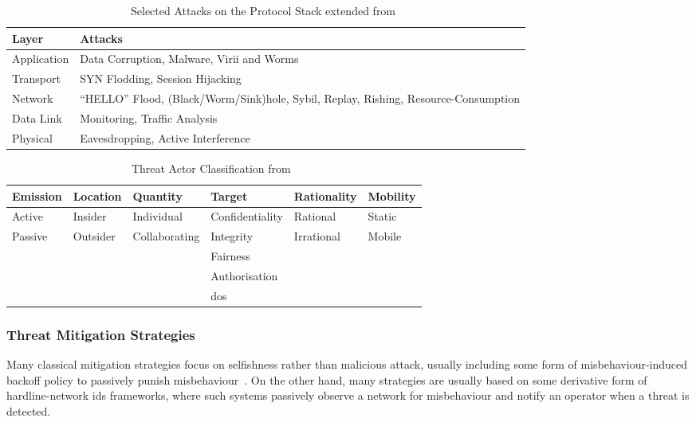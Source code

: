 \begin{table}
  \caption[Selected Attacks on the Protocol Stack]{Selected Attacks on the Protocol Stack extended from~\citet{csen2010security}}
  \label{tab:stack_attacks}
  \begin{tabularx}{\textwidth}{p{5cm} X}\toprule
    Layer & Attacks\\\midrule
    Application & Data Corruption, Malware, Virii and Worms\\
    Transport & SYN Flodding, Session Hijacking\\
    Network & ``HELLO'' Flood, (Black/Worm/Sink)hole, Sybil, Replay, Rishing, Resource-Consumption\\
    Data Link & Monitoring, Traffic Analysis\\
    Physical& Eavesdropping, Active Interference\\\bottomrule
  \end{tabularx}
\end{table}

\begin{table}
  \caption[Threat Actor Classification]{Threat Actor Classification from~\citet{Gagandeep2012}}
  \label{tab:attacker_class}
  \begin{tabularx}{\textwidth}{X X X X X X}\toprule
    Emission & Location & Quantity & Target & Rationality & Mobility \\\midrule
    Active & Insider & Individual & Confidentiality & Rational & Static\\
    Passive & Outsider & Collaborating & Integrity & Irrational & Mobile\\
            &         &               & Fairness & & \\
            &         &               & Authorisation & &\\
            &         &               &  \gls{dos} & &\\
    \bottomrule
    
  \end{tabularx}
\end{table}


\subsubsection{Threat Mitigation Strategies}



Many classical mitigation strategies focus on selfishness rather than malicious attack, usually including some form of misbehaviour-induced backoff policy to passively punish misbehaviour~\cite{Konorski2002,Cardenas:2004:DPM:1029102.1029107}.
On the other hand, many  strategies are usually based on some derivative form of hardline-network \gls{ids} frameworks, where such systems passively observe a network for misbehaviour and notify an operator when a threat is detected.

